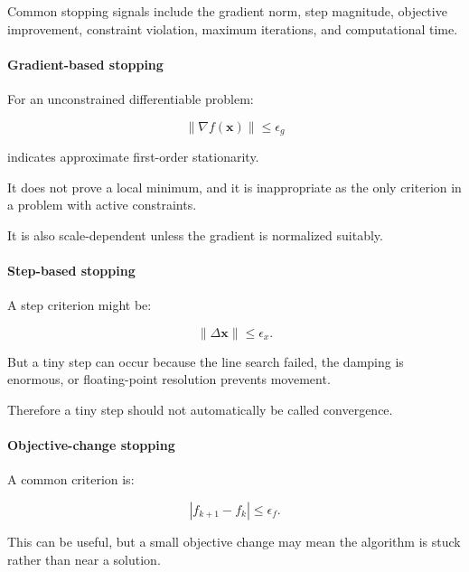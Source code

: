Common stopping signals include the gradient norm, step magnitude, objective improvement, constraint violation, maximum iterations, and computational time.

\paragraph{Gradient-based stopping}\label{02-foundations-ii-ch027-gradient-based-stopping}

\hypertarget{02-foundations-ii-ch027-gradient-based-stopping}{}

For an unconstrained differentiable problem:

\[
\boxed{ \|\nabla f(\mathbf x)\|\le\epsilon_g }
\]

indicates approximate first-order stationarity.

It does not prove a local minimum, and it is inappropriate as the only criterion in a problem with active constraints.

It is also scale-dependent unless the gradient is normalized suitably.

\paragraph{Step-based stopping}\label{02-foundations-ii-ch027-step-based-stopping}

\hypertarget{02-foundations-ii-ch027-step-based-stopping}{}

A step criterion might be:

\[
\|\Delta\mathbf x\| \le \epsilon_x.
\]

But a tiny step can occur because the line search failed, the damping is enormous, or floating-point resolution prevents movement.

Therefore a tiny step should not automatically be called convergence.

\paragraph{Objective-change stopping}\label{02-foundations-ii-ch027-objective-change-stopping}

\hypertarget{02-foundations-ii-ch027-objective-change-stopping}{}

A common criterion is:

\[
|f_{k+1}-f_k|\le\epsilon_f.
\]

This can be useful, but a small objective change may mean the algorithm is stuck rather than near a solution.

